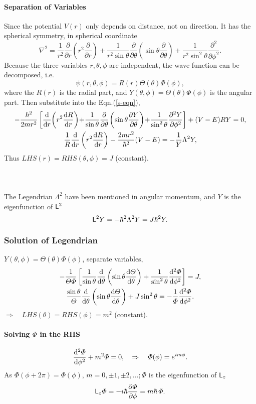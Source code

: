 \documentclass{article}
\def\d{{\rm d}}
\newcommand{\ko}[1]{\hspace{-#1 pt}}%
\newcommand{\ds}[2]{\frac{\d #1}{\d #2}}%
\newcommand{\sds}[2]{\frac{\d^2 #1}{\d #2^2}}
\newcommand{\pd}[2]{\frac{\partial #1}{\partial #2}}%
\newcommand{\spd}[2]{\frac{\partial^2 #1}{\partial #2^2}}
\newcommand{\kh}[1]{\left(#1\right)}
\begin{document}
\paragraph{Separation of Variables}
Since the potential $V(r)$ only depends on distance, not on direction. It has the spherical symmetry, %
in spherical coordinate
$$\nabla^2=\frac1{r^2}\pd{}r\kh{r^2\pd{}r}+\frac1{r^2\sin\theta}\pd{}\theta\kh{\sin\theta\pd{}\theta}+\frac1{r^2\sin^2\theta}\spd{}\phi.$$
Because the three variables $r,\theta,\phi$ are independent, the wave function can be decomposed, i.e.%
$$\psi(r,\theta,\phi)=R(r)\varTheta(\theta)\varPhi(\phi),$$
where the $R(r)$ is the radial part, and $Y(\theta,\phi)=\varTheta(\theta)\varPhi(\phi)$ is the angular part.
Then substitute into the Eqn.(\ref{s-eqn}),
\begin{gather*}
	-\frac{\hbar^2}{2mr^2}\left[\ds{}r\ko2\left(r^2\ds Rr\right)\ko2+\ko2\frac1{\sin\theta}\pd{}\theta\ko1\left(\sin\theta\pd Y\theta\right)\ko2+\ko2\frac1{\sin^2\theta}\spd Y\phi\right]+(V-E)RY=0,\\
	\frac1R\ds{}r\left(r^2\ds Rr\right)-\frac{2mr^2}{\hbar^2}(V-E)=-\frac1Y\Lambda^2Y,
\end{gather*}
Thus $LHS(r)=RHS(\theta,\phi)=J$ (constant).
\paragraph{~}The Legendrian $\Lambda^2$ have been mentioned in angular momentum, and $Y$ is the eigenfunction of $\mathsf L^2$
$$\mathsf L^2Y=-\hbar^2\Lambda^2Y=J\hbar^2Y.$$
\subsubsection{Solution of Legendrian}
$Y(\theta,\phi)=\varTheta(\theta)\varPhi(\phi)$, separate variables,
\begin{gather*}
	-\frac1{\varTheta\varPhi}\left[\frac1{\sin\theta}\ds{}\theta\left(\sin\theta\ds\varTheta\theta\right)+\frac1{\sin^2\theta}\sds\varPhi\phi\right]=J,\\
	\frac{\sin\theta}\varTheta\ds{}\theta\left(\sin\theta\ds\varTheta\theta\right)+J\sin^2\theta=-\frac1\varPhi\sds\varPhi\phi.
\end{gather*}
$\Rightarrow\quad LHS(\theta)=RHS(\phi)=m^2$ (constant).
\paragraph{Solving $\varPhi$ in the RHS}
$$\sds\varPhi\phi+m^2\varPhi=0,\quad\Rightarrow\quad\varPhi(\phi)=e^{im\phi}.$$
As $\varPhi(\phi+2\pi)=\varPhi(\phi)$, $m=0,\pm1,\pm2,\ldots;\varPhi$ is the eigenfunction of $\mathsf L_z$
$$\sL_z\varPhi=-i\hbar\pd\varPhi\phi=m\hbar\,\varPhi.$$
\end{document}
